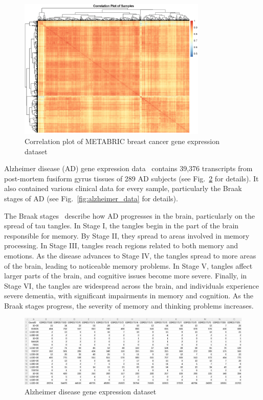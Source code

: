 \documentclass{statsoc}
\begin{document}
\begin{figure}[h!]
    \centering
    \includegraphics[width=0.8\textwidth]{metabric_corr.png}
    \caption{Correlation plot of METABRIC breast cancer gene expression dataset}
    \label{fig:metabric_corr}
\end{figure}

Alzheimer disease (AD) gene expression data~\citep{srinivasan2020alzheimer} contains 39,376 transcripts from post-mortem fusiform gyrus tissues of 289 AD subjects (see Fig.~\ref{fig:alzheimer_expr} for details). It also contained various clinical data for every sample, particularly the Braak stages of AD (see Fig.~\ref{fig:alzheimer_data} for details).

The Braak stages~\citep{braak1991neuropathological} describe how AD progresses in the brain, particularly on the spread of tau tangles. In Stage I, the tangles begin in the part of the brain responsible for memory. By Stage II, they spread to areas involved in memory processing. In Stage III, tangles reach regions related to both memory and emotions. As the disease advances to Stage IV, the tangles spread to more areas of the brain, leading to noticeable memory problems. In Stage V, tangles affect larger parts of the brain, and cognitive issues become more severe. Finally, in Stage VI, the tangles are widespread across the brain, and individuals experience severe dementia, with significant impairments in memory and cognition. As the Braak stages progress, the severity of memory and thinking problems increases.

\begin{figure}[h!]
    \centering
    \includegraphics[width=\textwidth]{alzheimer_expr.png}
    \caption{Alzheimer disease gene expression dataset}
    \label{fig:alzheimer_expr}
\end{figure}
\end{document}
